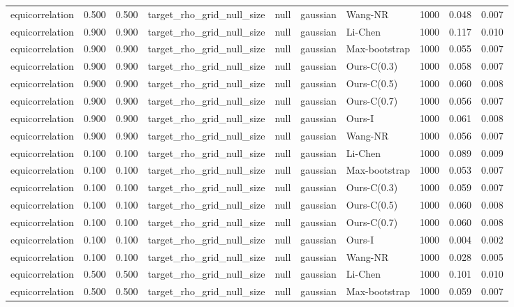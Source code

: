 \begin{tabular}{lrrllllrrr}
equicorrelation & 0.500 & 0.500 & target\_rho\_grid\_null\_size & null & gaussian & Wang-NR & 1000 & 0.048 & 0.007 \\
equicorrelation & 0.900 & 0.900 & target\_rho\_grid\_null\_size & null & gaussian & Li-Chen & 1000 & 0.117 & 0.010 \\
equicorrelation & 0.900 & 0.900 & target\_rho\_grid\_null\_size & null & gaussian & Max-bootstrap & 1000 & 0.055 & 0.007 \\
equicorrelation & 0.900 & 0.900 & target\_rho\_grid\_null\_size & null & gaussian & Ours-C(0.3) & 1000 & 0.058 & 0.007 \\
equicorrelation & 0.900 & 0.900 & target\_rho\_grid\_null\_size & null & gaussian & Ours-C(0.5) & 1000 & 0.060 & 0.008 \\
equicorrelation & 0.900 & 0.900 & target\_rho\_grid\_null\_size & null & gaussian & Ours-C(0.7) & 1000 & 0.056 & 0.007 \\
equicorrelation & 0.900 & 0.900 & target\_rho\_grid\_null\_size & null & gaussian & Ours-I & 1000 & 0.061 & 0.008 \\
equicorrelation & 0.900 & 0.900 & target\_rho\_grid\_null\_size & null & gaussian & Wang-NR & 1000 & 0.056 & 0.007 \\
equicorrelation & 0.100 & 0.100 & target\_rho\_grid\_null\_size & null & gaussian & Li-Chen & 1000 & 0.089 & 0.009 \\
equicorrelation & 0.100 & 0.100 & target\_rho\_grid\_null\_size & null & gaussian & Max-bootstrap & 1000 & 0.053 & 0.007 \\
equicorrelation & 0.100 & 0.100 & target\_rho\_grid\_null\_size & null & gaussian & Ours-C(0.3) & 1000 & 0.059 & 0.007 \\
equicorrelation & 0.100 & 0.100 & target\_rho\_grid\_null\_size & null & gaussian & Ours-C(0.5) & 1000 & 0.060 & 0.008 \\
equicorrelation & 0.100 & 0.100 & target\_rho\_grid\_null\_size & null & gaussian & Ours-C(0.7) & 1000 & 0.060 & 0.008 \\
equicorrelation & 0.100 & 0.100 & target\_rho\_grid\_null\_size & null & gaussian & Ours-I & 1000 & 0.004 & 0.002 \\
equicorrelation & 0.100 & 0.100 & target\_rho\_grid\_null\_size & null & gaussian & Wang-NR & 1000 & 0.028 & 0.005 \\
equicorrelation & 0.500 & 0.500 & target\_rho\_grid\_null\_size & null & gaussian & Li-Chen & 1000 & 0.101 & 0.010 \\
equicorrelation & 0.500 & 0.500 & target\_rho\_grid\_null\_size & null & gaussian & Max-bootstrap & 1000 & 0.059 & 0.007 \\

\end{tabular}
